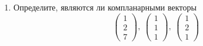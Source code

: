 \begin{enumerate}
    \item Определите, являются ли компланарными векторы
    \[
        \begin{pmatrix}
            1 \\ 2 \\ 7
        \end{pmatrix},\ 
        \begin{pmatrix}
            1 \\ 1 \\ 1
        \end{pmatrix},\ 
        \begin{pmatrix}
            1 \\ 2 \\ 1
        \end{pmatrix}
    \]

    
\end{enumerate}
